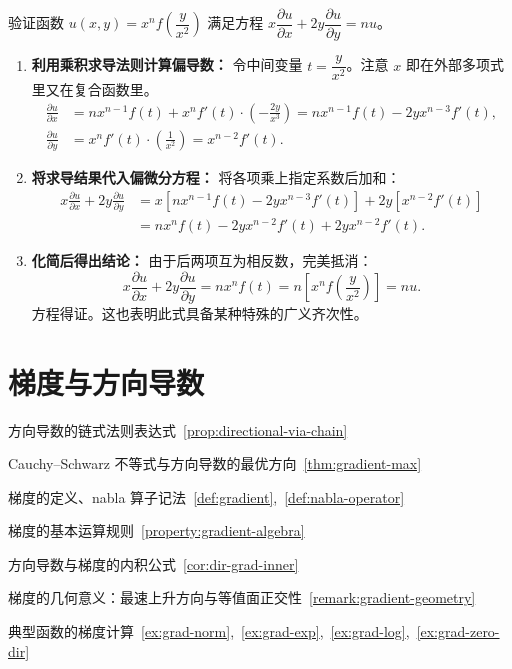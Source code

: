 \documentclass[lang=cn,11pt]{elegantbook}
\begin{document}
\begin{exercise}[抽象函数验证偏微分方程]
验证函数 $u(x,y) = x^n f\left(\dfrac{y}{x^2}\right)$ 满足方程 $x\dfrac{\partial u}{\partial x} + 2y\dfrac{\partial u}{\partial y} = nu$。
\end{exercise}

\begin{solution}
\begin{enumerate}
  \item \textbf{利用乘积求导法则计算偏导数：}
  令中间变量 $t = \dfrac{y}{x^2}$。注意 $x$ 即在外部多项式里又在复合函数里。
  \begin{align*}
  \frac{\partial u}{\partial x} &= n x^{n-1} f(t) + x^n f'(t) \cdot \left(-\frac{2y}{x^3}\right) = n x^{n-1} f(t) - 2y x^{n-3} f'(t), \\
  \frac{\partial u}{\partial y} &= x^n f'(t) \cdot \left(\frac{1}{x^2}\right) = x^{n-2} f'(t).
  \end{align*}

  \item \textbf{将求导结果代入偏微分方程：}
  将各项乘上指定系数后加和：
  \begin{align*}
  x\frac{\partial u}{\partial x} + 2y\frac{\partial u}{\partial y} &= x\left[n x^{n-1} f(t) - 2y x^{n-3} f'(t)\right] + 2y\left[x^{n-2} f'(t)\right] \\
  &= n x^n f(t) - 2y x^{n-2} f'(t) + 2y x^{n-2} f'(t).
  \end{align*}

  \item \textbf{化简后得出结论：}
  由于后两项互为相反数，完美抵消：
  \[
  x\frac{\partial u}{\partial x} + 2y\frac{\partial u}{\partial y} = n x^n f(t) = n \left[x^n f\left(\frac{y}{x^2}\right)\right] = nu.
  \]
  方程得证。这也表明此式具备某种特殊的广义齐次性。
\end{enumerate}
\end{solution}



\section{梯度与方向导数}

\begin{introduction}
  \item 方向导数的链式法则表达式~\ref{prop:directional-via-chain}
  \item Cauchy--Schwarz 不等式与方向导数的最优方向~\ref{thm:gradient-max}
  \item 梯度的定义、nabla 算子记法~\ref{def:gradient},~\ref{def:nabla-operator}
  \item 梯度的基本运算规则~\ref{property:gradient-algebra}
  \item 方向导数与梯度的内积公式~\ref{cor:dir-grad-inner}
  \item 梯度的几何意义：最速上升方向与等值面正交性~\ref{remark:gradient-geometry}
  \item 典型函数的梯度计算~\ref{ex:grad-norm},~\ref{ex:grad-exp},~\ref{ex:grad-log},~\ref{ex:grad-zero-dir}
\end{introduction}
\end{document}
